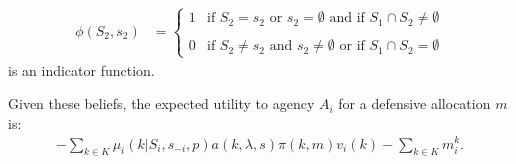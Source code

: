 \documentclass[12pt]{article}
\begin{document}
\begin{align*}
\phi(S_2,s_2)&=\left\{\begin{array}{ll}
1&\mbox{if }S_2=s_2\mbox{ or }s_2=\emptyset\mbox{ and if }S_1\cap S_2\neq\emptyset\\
&\\
0&\mbox{if }S_2\neq s_2\mbox{ and }s_2\neq\emptyset\mbox{ or if }S_1\cap S_2=\emptyset
\end{array}\right.
\end{align*}is an indicator function.



Given these beliefs, the expected utility to agency $A_i$ for a defensive allocation $m$ is:
\begin{align*}
-\sum_{k \in K} \mu_i(k|S_i, s_{-i},p) a(k,\lambda,s)\pi(k, m)v_i(k)-\sum_{k\in K}m_i^k.
\end{align*}
\end{document}

